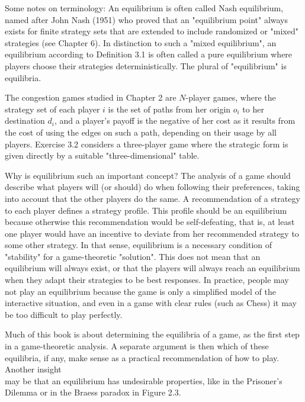 \documentclass[12pt]{article}
\begin{document}
Some notes on terminology: An equilibrium is often called Nash equilibrium, named after John Nash (1951) who proved that an "equilibrium point" always exists for finite strategy sets that are extended to include randomized or "mixed" strategies (see Chapter 6). In distinction to such a "mixed equilibrium", an equilibrium according to Definition 3.1 is often called a pure equilibrium where players choose their strategies deterministically. The plural of "equilibrium" is equilibria.

The congestion games studied in Chapter 2 are $N$-player games, where the strategy set of each player $i$ is the set of paths from her origin $o_{i}$ to her destination $d_{i}$, and a player's payoff is the negative of her cost as it results from the cost of using the edges on such a path, depending on their usage by all players. Exercise 3.2 considers a three-player game where the strategic form is given directly by a suitable "three-dimensional" table.

Why is equilibrium such an important concept? The analysis of a game should describe what players will (or should) do when following their preferences, taking into account that the other players do the same. A recommendation of a strategy to each player defines a strategy profile. This profile should be an equilibrium because otherwise this recommendation would be self-defeating, that is, at least one player would have an incentive to deviate from her recommended strategy to some other strategy. In that sense, equilibrium is a necessary condition of "stability" for a game-theoretic "solution". This does not mean that an equilibrium will always exist, or that the players will always reach an equilibrium when they adapt their strategies to be best responses. In practice, people may not play an equilibrium because the game is only a simplified model of the interactive situation, and even in a game with clear rules (such as Chess) it may be too difficult to play perfectly.

Much of this book is about determining the equilibria of a game, as the first step in a game-theoretic analysis. A separate argument is then which of these equilibria, if any, make sense as a practical recommendation of how to play. Another insight\\
may be that an equilibrium has undesirable properties, like in the Prisoner's Dilemma or in the Braess paradox in Figure 2.3.
\end{document}
